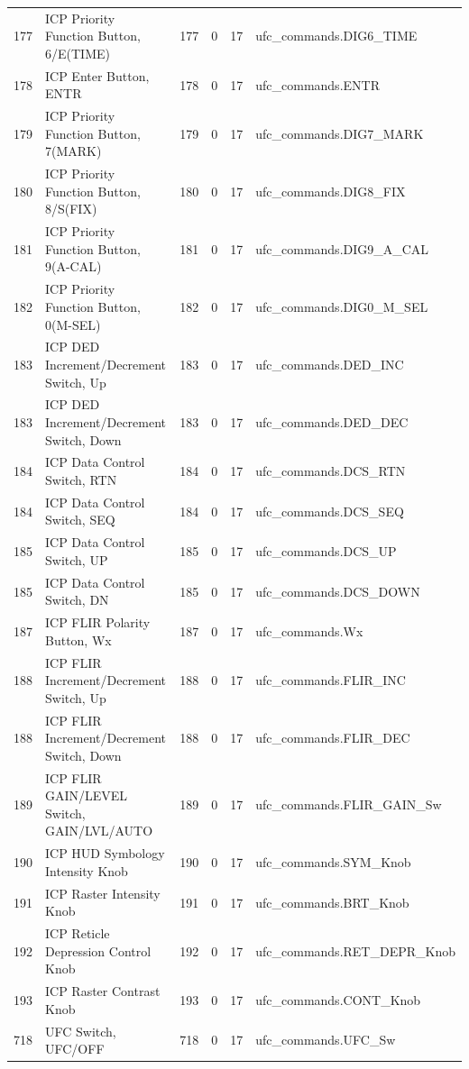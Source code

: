 \documentclass[10pt,a4paper]{article}
\begin{document}
\begin{longtable}{>{\ttfamily\small}p{38mm} >{\small}p{72mm} r r r >{\ttfamily\small}p{48mm}}
  177 & ICP Priority Function Button, 6/E(TIME) & 177 & 0 & 17 & ufc\_commands.DIG6\_TIME \\
\rowcolor{rowodd}
  178 & ICP Enter Button, ENTR & 178 & 0 & 17 & ufc\_commands.ENTR \\
  179 & ICP Priority Function Button, 7(MARK) & 179 & 0 & 17 & ufc\_commands.DIG7\_MARK \\
\rowcolor{rowodd}
  180 & ICP Priority Function Button, 8/S(FIX) & 180 & 0 & 17 & ufc\_commands.DIG8\_FIX \\
  181 & ICP Priority Function Button, 9(A-CAL) & 181 & 0 & 17 & ufc\_commands.DIG9\_A\_CAL \\
\rowcolor{rowodd}
  182 & ICP Priority Function Button, 0(M-SEL) & 182 & 0 & 17 & ufc\_commands.DIG0\_M\_SEL \\
  183 & ICP DED Increment/Decrement Switch, Up & 183 & 0 & 17 & ufc\_commands.DED\_INC \\
\rowcolor{rowodd}
  183 & ICP DED Increment/Decrement Switch, Down & 183 & 0 & 17 & ufc\_commands.DED\_DEC \\
  184 & ICP Data Control Switch, RTN & 184 & 0 & 17 & ufc\_commands.DCS\_RTN \\
\rowcolor{rowodd}
  184 & ICP Data Control Switch, SEQ & 184 & 0 & 17 & ufc\_commands.DCS\_SEQ \\
  185 & ICP Data Control Switch, UP & 185 & 0 & 17 & ufc\_commands.DCS\_UP \\
\rowcolor{rowodd}
  185 & ICP Data Control Switch, DN & 185 & 0 & 17 & ufc\_commands.DCS\_DOWN \\
  187 & ICP FLIR Polarity Button, Wx & 187 & 0 & 17 & ufc\_commands.Wx \\
\rowcolor{rowodd}
  188 & ICP FLIR Increment/Decrement Switch, Up & 188 & 0 & 17 & ufc\_commands.FLIR\_INC \\
  188 & ICP FLIR Increment/Decrement Switch, Down & 188 & 0 & 17 & ufc\_commands.FLIR\_DEC \\
\rowcolor{rowodd}
  189 & ICP FLIR GAIN/LEVEL Switch, GAIN/LVL/AUTO & 189 & 0 & 17 & ufc\_commands.FLIR\_GAIN\_Sw \\
  190 & ICP HUD Symbology Intensity Knob & 190 & 0 & 17 & ufc\_commands.SYM\_Knob \\
\rowcolor{rowodd}
  191 & ICP Raster Intensity Knob & 191 & 0 & 17 & ufc\_commands.BRT\_Knob \\
  192 & ICP Reticle Depression Control Knob & 192 & 0 & 17 & ufc\_commands.RET\_DEPR\_Knob \\
\rowcolor{rowodd}
  193 & ICP Raster Contrast Knob & 193 & 0 & 17 & ufc\_commands.CONT\_Knob \\
  718 & UFC Switch, UFC/OFF & 718 & 0 & 17 & ufc\_commands.UFC\_Sw \\
\end{longtable}
\end{document}

